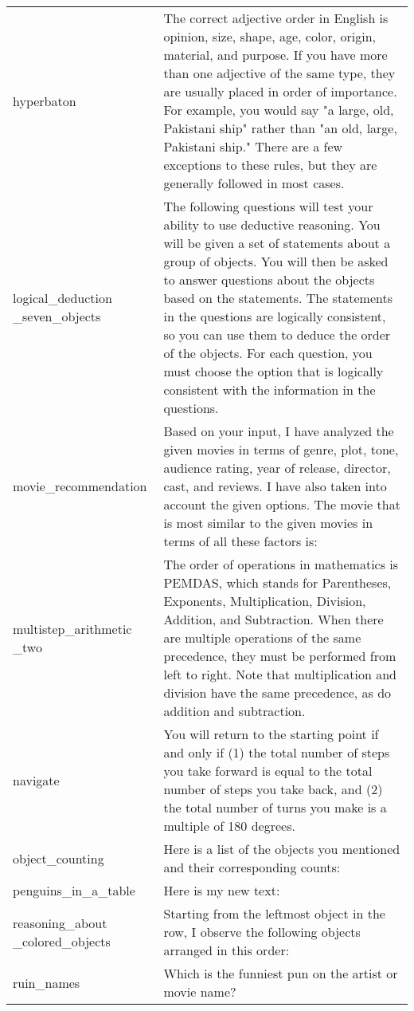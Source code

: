 \begin{table}[H]
{\begin{tabular}{P{2.3cm}P{11.6cm}}
hyperbaton & The correct adjective order in English is opinion, size, shape, age, color, origin, material, and purpose. If you have more than one adjective of the same type, they are usually placed in order of importance. For example, you would say "a large, old, Pakistani ship" rather than "an old, large, Pakistani ship." There are a few exceptions to these rules, but they are generally followed in most cases.\\ [2ex]
logical\_deduction \_seven\_objects & The following questions will test your ability to use deductive reasoning. You will be given a set of statements about a group of objects. You will then be asked to answer questions about the objects based on the statements. The statements in the questions are logically consistent, so you can use them to deduce the order of the objects. For each question, you must choose the option that is logically consistent with the information in the questions.\\ [2ex]
movie\_recommendation & Based on your input, I have analyzed the given movies in terms of genre, plot, tone, audience rating, year of release, director, cast, and reviews. I have also taken into account the given options. The movie that is most similar to the given movies in terms of all these factors is:\\ [2ex]
multistep\_arithmetic \_two & The order of operations in mathematics is PEMDAS, which stands for Parentheses, Exponents, Multiplication, Division, Addition, and Subtraction. When there are multiple operations of the same precedence, they must be performed from left to right. Note that multiplication and division have the same precedence, as do addition and subtraction.\\ [2ex]
navigate & You will return to the starting point if and only if (1) the total number of steps you take forward is equal to the total number of steps you take back, and (2) the total number of turns you make is a multiple of 180 degrees.\\ [2ex]
object\_counting & Here is a list of the objects you mentioned and their corresponding counts:\\ [2ex]
penguins\_in\_a\_table & Here is my new text:\\ [2ex]
reasoning\_about \_colored\_objects & Starting from the leftmost object in the row, I observe the following objects arranged in this order:\\ [4ex]
ruin\_names & Which is the funniest pun on the artist or movie name?\\ [2ex]

\end{tabular}}
\end{table}
